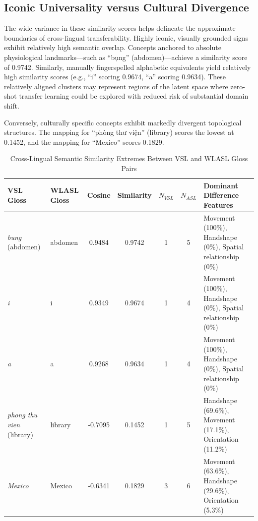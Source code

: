 \documentclass{ieeeaccess}
\DeclareRobustCommand{\textbf}[1]{{\bfseries #1}}
\begin{document}
\subsection{Iconic Universality versus Cultural Divergence} 
The wide variance in these similarity scores helps delineate the approximate boundaries of cross-lingual transferability. Highly iconic, visually grounded signs exhibit relatively high semantic overlap. Concepts anchored to absolute physiological landmarks—such as ``bụng'' (abdomen)—achieve a similarity score of 0.9742. Similarly, manually fingerspelled alphabetic equivalents yield relatively high similarity scores (e.g., ``i'' scoring 0.9674, ``a'' scoring 0.9634). These relatively aligned clusters may represent regions of the latent space where zero-shot transfer learning could be explored with reduced risk of substantial domain shift.

Conversely, culturally specific concepts exhibit markedly divergent topological structures. The mapping for ``phòng thư viện'' (library) scores the lowest at 0.1452, and the mapping for ``Mexico'' scores 0.1829.

\begin{table}[!t]
\caption{Cross-Lingual Semantic Similarity Extremes Between VSL and WLASL Gloss Pairs}
\label{tab:similarity_extremes}
\centering
\small
\setlength{\tabcolsep}{5pt}
\begin{tabular}{llccccp{6.2cm}}
\toprule
\textbf{VSL Gloss} &
\textbf{WLASL Gloss} &
\textbf{Cosine} &
\textbf{Similarity} &
\textbf{$N_{VSL}$} &
\textbf{$N_{ASL}$} &
\textbf{Dominant Difference Features} \\
\midrule

\textit{bung} (abdomen) &
abdomen &
0.9484 &
0.9742 &
1 &
5 &
Movement (100\%), Handshape (0\%), Spatial relationship (0\%) \\

\textit{i} &
i &
0.9349 &
0.9674 &
1 &
4 &
Movement (100\%), Handshape (0\%), Spatial relationship (0\%) \\

\textit{a} &
a &
0.9268 &
0.9634 &
1 &
4 &
Movement (100\%), Handshape (0\%), Spatial relationship (0\%) \\

\midrule

\textit{phong thu vien} (library) &
library &
-0.7095 &
0.1452 &
1 &
5 &
Handshape (69.6\%), Movement (17.1\%), Orientation (11.2\%) \\

\textit{Mexico} &
Mexico &
-0.6341 &
0.1829 &
3 &
6 &
Movement (63.6\%), Handshape (29.6\%), Orientation (5.3\%) \\

\bottomrule
\end{tabular}
\end{table}
\end{document}
